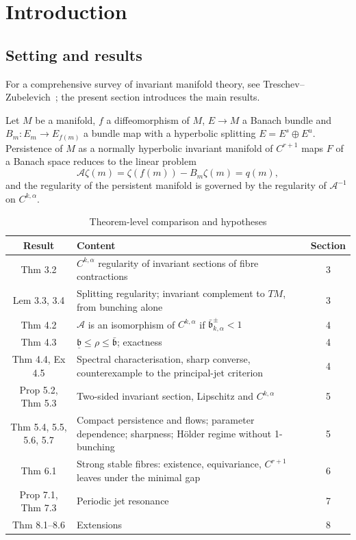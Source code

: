\documentclass[11pt,a4paper]{article}
\theoremstyle{plain}
\theoremstyle{definition}
\theoremstyle{remark}
\numberwithin{equation}{section}
\numberwithin{figure}{section}
\begin{document}
\section{Introduction}

\subsection{Setting and results}

For a comprehensive survey of invariant manifold theory, see Treschev–Zubelevich~\cite{tre2010}; the present section introduces the main results.

Let $M$ be a manifold, $f$ a diffeomorphism of $M$, $E\to M$ a Banach bundle and $B_m:E_m\to E_{f(m)}$ a bundle map with a hyperbolic splitting $E=E^s\oplus E^u$. Persistence of $M$ as a normally hyperbolic invariant manifold of $C^{r+1}$ maps $F$ of a Banach space reduces to the linear problem
\[
\mathcal A\zeta(m)=\zeta(f(m))-B_m\zeta(m)=q(m),
\]
and the regularity of the persistent manifold is governed by the regularity of $\mathcal A^{-1}$ on $C^{k,\alpha}$.

\begin{table}[h]
\centering
\begin{tabularx}{\textwidth}{c X c}
\toprule
Result & Content & Section\\
\midrule
Thm 3.2 & $C^{k,\alpha}$ regularity of invariant sections of fibre contractions & 3 \\
Lem 3.3, 3.4 & Splitting regularity; invariant complement to $TM$, from bunching alone & 3 \\
Thm 4.2 & $\mathcal A$ is an isomorphism of $C^{k,\alpha}$ if $\bar{\mathfrak b}^\pm_{k,\alpha}<1$ & 4 \\
Thm 4.3 & $\underline{\mathfrak b}\le\rho\le\bar{\mathfrak b}$; exactness & 4 \\
Thm 4.4, Ex 4.5 & Spectral characterisation, sharp converse, counterexample to the principal-jet criterion & 4 \\
Prop 5.2, Thm 5.3 & Two-sided invariant section, Lipschitz and $C^{k,\alpha}$ & 5 \\
Thm 5.4, 5.5, 5.6, 5.7 & Compact persistence and flows; parameter dependence; sharpness; Hölder regime without 1-bunching & 5 \\
Thm 6.1 & Strong stable fibres: existence, equivariance, $C^{r+1}$ leaves under the minimal gap & 6 \\
Prop 7.1, Thm 7.3 & Periodic jet resonance & 7 \\
Thm 8.1–8.6 & Extensions & 8 \\
\bottomrule
\end{tabularx}
\caption{Theorem-level comparison and hypotheses}
\label{tab:results}
\end{table}
\end{document}
